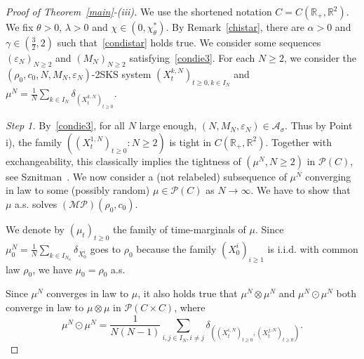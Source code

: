 \documentclass[11pt]{article}
\newcommand{\R}{\mathbb{R}}
\newcommand{\1}{\mathbbm{1}}
\newcommand{\Aa}{\mathcal A}
\newcommand{\Pp}{\mathcal P}
\newcommand{\e}{\varepsilon}
\newcommand{\vip}{\vskip5pt}
\begin{document}
\begin{proof}[Proof of Theorem~\ref{main}-(iii)]
We use the shortened notation $C=C(\R_+,\R^2)$. 
We fix $\theta>0$, $\lambda>0$ and $\chi \in (0,\chi^*_\theta)$. By Remark~\ref{chistar},
there are $\alpha>0$ and $\gamma \in (\frac32,2)$ such that~\eqref{condistar} holds true. We consider
some sequences $(\e_N)_{N\geq 2}$ and $(M_N)_{N\geq 2}$ satisfying~\eqref{condie3}.
For each $N\geq 2$, we consider the $(\rho_0,c_0,N,M_N,\e_{N})$-2SKS system $(X^{k,N}_t)_{t\geq 0, k\in I_N}$
and  $\mu^N=\frac1N\sum_{k\in I_N}\delta_{(X^{k,N}_t)_{t\geq 0}}$.

\vip
{\it Step 1.} By~\eqref{condie3}, for all $N$ large enough, $(N,M_N,\e_N)\in \Aa_\sigma$. Thus by Point i),
the family $((X^{1,N}_t)_{t\geq 0} : N\geq 2)$ is tight in $C(\R_+,\R^2)$. Together with
exchangeability, this classically implies the tightness of $(\mu^{N}, N\geq 2)$ in $\Pp(C)$,
see Sznitman~\cite[Proposition~2.2]{Sznitman}.
We now consider a (not relabeled) subsequence of $\mu^N$ converging in law to some (possibly random)
$\mu\in \Pp(C)$ as $N\to \infty$. We have to show that $\mu$ a.s. solves $\mathcal{(MP)}(\rho_0,c_0)$.
\vip

We denote by $(\mu_t)_{t\geq 0}$ the family of time-marginals of $\mu$.
Since $\mu^N_0=\frac1N\sum_{k\in I_{N_n}}\delta_{X^i_0}$ goes to $\rho_0$ because the family $(X^i_0)_{i \geq 1}$
is i.i.d. with common law $\rho_0$, we have $\mu_0=\rho_0$ a.s.

\vip

Since $\mu^N$ converges
in law to $\mu$, it also holds true that $\mu^N \otimes \mu^N$
and $\mu^N \odot \mu^N$ both converge in law to $\mu\otimes \mu$
in $\Pp(C\times C)$, where
$$
\mu^N \odot \mu^N=
\frac 1 {N(N-1)}\sum_{i,j \in I_{N},i\neq j} \delta_{((X^{i,N}_t)_{t\geq 0},(X^{j,N}_t)_{t\geq 0})}. 
$$


\end{proof}
\end{document}
